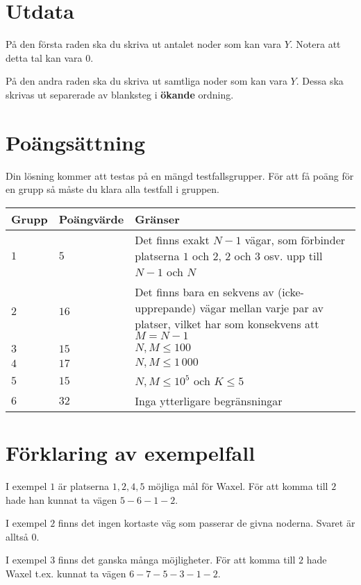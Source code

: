 \section*{Utdata}
På den första raden ska du skriva ut antalet noder som kan vara $Y$.
Notera att detta tal kan vara $0$.

På den andra raden ska du skriva ut samtliga noder som kan vara $Y$.
Dessa ska skrivas ut separerade av blanksteg i \textbf{ökande} ordning.

\section*{Poängsättning}
Din lösning kommer att testas på en mängd testfallsgrupper.
För att få poäng för en grupp så måste du klara alla testfall i gruppen.

\noindent
\begin{tabular}{| l | l | p{10cm} |}
\hline
Grupp & Poängvärde & Gränser \\ \hline
$1$    & $5$         & Det finns exakt $N - 1$ vägar, som förbinder platserna $1$ och $2$, $2$ och $3$ osv. upp till $N - 1$ och $N$ \\ \hline
$2$    & $16$         & Det finns bara en sekvens av (icke-upprepande) vägar mellan varje par av platser, vilket har som konsekvens att $M = N - 1$ \\ \hline
$3$    & $15$         & $N,M \leq 100$ \\ \hline
$4$    & $17$         & $N,M \leq 1\,000$ \\ \hline
$5$    & $15$         & $N,M \leq 10^5$ och $K \leq 5$ \\ \hline
$6$    & $32$         & Inga ytterligare begränsningar \\ \hline
\end{tabular}

\section*{Förklaring av exempelfall}
I exempel $1$ är platserna $1,2,4,5$ möjliga mål för Waxel.
För att komma till $2$ hade han kunnat ta vägen $5-6-1-2$.

I exempel $2$ finns det ingen kortaste väg som passerar de givna noderna.
Svaret är alltså $0$.

I exempel $3$ finns det ganska många möjligheter.
För att komma till $2$ hade Waxel t.ex. kunnat ta vägen $6-7-5-3-1-2$.
